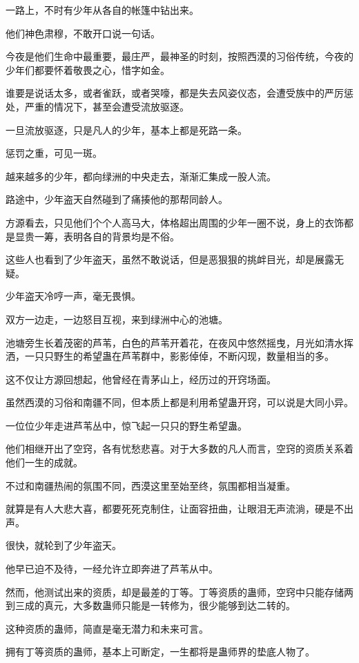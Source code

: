\begin{this_body}
一路上，不时有少年从各自的帐篷中钻出来。

他们神色肃穆，不敢开口说一句话。

今夜是他们生命中最重要，最庄严，最神圣的时刻，按照西漠的习俗传统，今夜的少年们都要怀着敬畏之心，惜字如金。

谁要是说话太多，或者雀跃，或者哭嚎，都是失去风姿仪态，会遭受族中的严厉惩处，严重的情况下，甚至会遭受流放驱逐。

一旦流放驱逐，只是凡人的少年，基本上都是死路一条。

惩罚之重，可见一斑。

越来越多的少年，都向绿洲的中央走去，渐渐汇集成一股人流。

路途中，少年盗天自然碰到了痛揍他的那帮同龄人。

方源看去，只见他们个个人高马大，体格超出周围的少年一圈不说，身上的衣饰都是显贵一筹，表明各自的背景均是不俗。

这些人也看到了少年盗天，虽然不敢说话，但是恶狠狠的挑衅目光，却是展露无疑。

少年盗天冷哼一声，毫无畏惧。

双方一边走，一边怒目互视，来到绿洲中心的池塘。

池塘旁生长着茂密的芦苇，白色的芦苇开着花，在夜风中悠然摇曳，月光如清水挥洒，一只只野生的希望蛊在芦苇群中，影影倬倬，不断闪现，数量相当的多。

这不仅让方源回想起，他曾经在青茅山上，经历过的开窍场面。

虽然西漠的习俗和南疆不同，但本质上都是利用希望蛊开窍，可以说是大同小异。

一位位少年走进芦苇丛中，惊飞起一只只的野生希望蛊。

他们相继开出了空窍，各有忧愁悲喜。对于大多数的凡人而言，空窍的资质关系着他们一生的成就。

不过和南疆热闹的氛围不同，西漠这里至始至终，氛围都相当凝重。

就算是有人大悲大喜，都要死死克制住，让面容扭曲，让眼泪无声流淌，硬是不出声。

很快，就轮到了少年盗天。

他早已迫不及待，一经允许立即奔进了芦苇从中。

然而，他测试出来的资质，却是最差的丁等。丁等资质的蛊师，空窍中只能存储两到三成的真元，大多数蛊师只能是一转修为，很少能够到达二转的。

这种资质的蛊师，简直是毫无潜力和未来可言。

拥有丁等资质的蛊师，基本上可断定，一生都将是蛊师界的垫底人物了。


\end{this_body}
